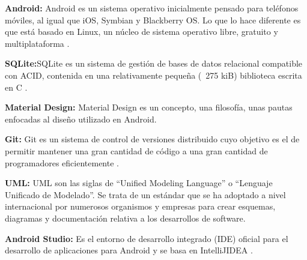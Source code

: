 \textbf{Android:} Android es un sistema operativo inicialmente pensado para teléfonos móviles, al igual que iOS, Symbian y Blackberry OS. Lo que lo hace diferente es que está basado en Linux, un núcleo de sistema operativo libre, gratuito y multiplataforma \citep{studio2016conoce}.

\textbf{SQLite:}SQLite es un sistema de gestión de bases de datos relacional compatible con ACID, contenida en una relativamente pequeña (~275 kiB) biblioteca escrita en C \citep{owens2010sqlite}.

\textbf{Material Design:} Material Design es un concepto, una filosofía, unas pautas enfocadas al diseño utilizado en Android.

\textbf{Git:} Git es un sistema de control de versiones distribuido cuyo objetivo es el de permitir mantener una gran cantidad de código a una gran cantidad de programadores eficientemente \citep{alvarez2014introduccion}.

\textbf{UML:} UML son las siglas de “Unified Modeling Language” o “Lenguaje Unificado de Modelado”. Se trata de un estándar que se ha adoptado a nivel internacional por numerosos organismos y empresas para crear esquemas, diagramas y documentación relativa a los desarrollos de software.

\textbf{Android Studio:} Es el entorno de desarrollo integrado (IDE) oficial para el desarrollo de aplicaciones para Android y se basa en IntelliJIDEA \citep{studio2016conoce}.